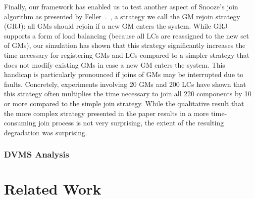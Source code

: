 Finally, our framework has enabled us to test another aspect of
Snooze's join algorithm as presented by
Feller~\etal.~\cite{feller:ccgrid12},
a strategy we call the GM rejoin
strategy (GRJ): all GMs should rejoin if a new GM enters the
system. While GRJ supports a form of load balancing (because all LCs
are reassigned to the new set of GMs), our simulation has shown that
this strategy significantly increases the time necessary for
registering GMs and LCs compared to a simpler strategy that does not
modify existing GMs in case a new GM enters the system. This handicap
is particularly pronounced if joins of GMs may be interrupted due to
faults. Concretely, experiments involving 20 GMs and 200 LCs have
shown that this strategy often multiplies the time necessary to join
all 220 components by 10 or more compared to the simple join
strategy. While the qualitative result that the more complex strategy
presented in the paper results in a more time-consuming join process
is not very surprising, the extent of the resulting degradation was
surprising.



\subsubsection{DVMS Analysis}

\section{Related Work}
\label{sec:related}


